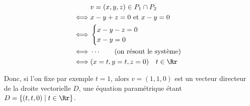 {\begin{enumerate}
{\begin{align*}
     & v=(x,y,z) \in P_1 \cap P_2 \\ 
\iff & x-y+z=0 \text{ et } x-y=0 \\
\iff &
\begin{cases}
  x-y-z = 0 \\
  x-y = 0 \\
 \end{cases} \\
\iff & \cdots \qquad  \text{(on résout le système)} \\
\iff & (x=t, y = t, z = 0) \quad t \in \Rr \\
\end{align*}  

Donc, si l'on fixe par exemple $t=1$, alors $v=(1,1,0)$ 
est un vecteur directeur de la droite vectorielle $D$,
une équation paramétrique étant $D=\{(t,t,0) \mid t\in \Rr \}$.}
\end{enumerate}
}

